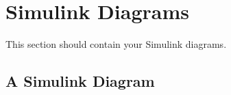 \section{Simulink Diagrams}\label{sec:simulink}
This section should contain your Simulink diagrams.

\subsection{A Simulink Diagram}
